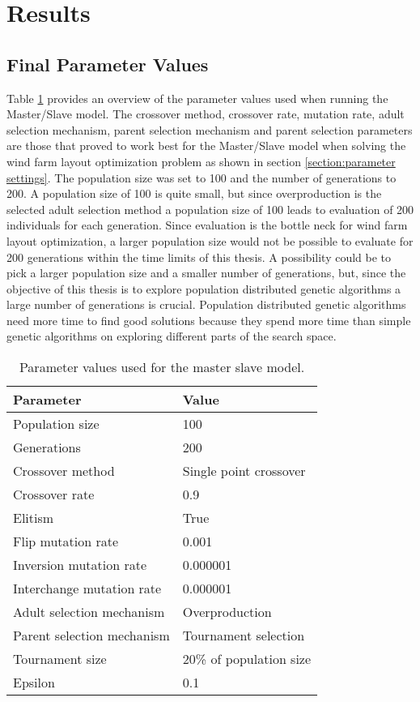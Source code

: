 \section{Results}\label{section:results}


\subsection{Final Parameter Values}


\noindent Table \ref{table:final parameter settings master slave model} provides an overview of the parameter values used when running the Master/Slave model. The crossover method, crossover rate, mutation rate, adult selection mechanism, parent selection mechanism and parent selection parameters are those that proved to work best for the Master/Slave model when solving the wind farm layout optimization problem as shown in section \ref{section:parameter settings}. The population size was set to 100 and the number of generations to 200. A population size of 100 is quite small, but since overproduction is the selected adult selection method a population size of 100 leads to evaluation of 200 individuals for each generation. Since evaluation is the bottle neck for wind farm layout optimization, a larger population size would not be possible to evaluate for 200 generations within the time limits of this thesis. A possibility could be to pick a larger population size and a smaller number of generations, but, since the objective of this thesis is to explore population distributed genetic algorithms a large number of generations is crucial. Population distributed genetic algorithms need more time to find good solutions because they spend more time than simple genetic algorithms on exploring different parts of the search space. \\


\begin{table}[h!]
\centering
\caption{Parameter values used for the master slave model.}
\label{table:final parameter settings master slave model}
\begin{tabular}{l|l}
\textbf{Parameter} & \textbf{Value} \\ 
\hline 
Population size & 100 \\  
Generations & 200 \\ 
Crossover method & Single point crossover \\ 
Crossover rate & 0.9 \\ 
Elitism & True \\ 
Flip mutation rate & 0.001 \\ 
Inversion mutation rate & 0.000001 \\ 
Interchange mutation rate & 0.000001 \\ 
Adult selection mechanism & Overproduction \\ 
Parent selection mechanism & Tournament selection \\ 
Tournament size & 20\% of population size\\ 
Epsilon & 0.1 \\ 
\end{tabular} 
\end{table}


